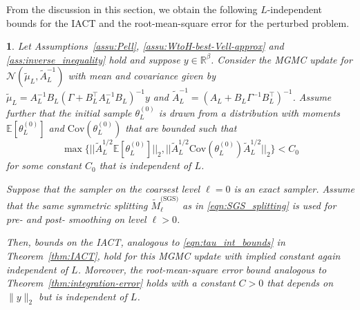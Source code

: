 \documentclass[11pt,english]{article}
\theoremstyle{plain}
\newtheorem{thm}{\protect\theoremname}[section]
\theoremstyle{plain}
\theoremstyle{plain}
\theoremstyle{plain}
\numberwithin{equation}{section}
\providecommand{\theoremname}{Theorem}
\begin{document}
From the discussion in this section, we obtain the following $L$-independent bounds for the IACT and the root-mean-square error for the perturbed problem.
\begin{thm}\label{thm:IACT_posterior_robustness}
  Let Assumptions~\ref{assu:Pell}, \ref{assu:WtoH-best-Vell-approx} and \ref{ass:inverse_inequality} hold and suppose %
  $y\in\mathbb{R}^{\beta}$. Consider the MGMC update
  for $\mathcal{N}(\widetilde{\mu}_{L},\widetilde{A}_{L}^{-1})$
	with mean and covariance given by $\widetilde{\mu}_{L}=A_{L}^{-1}B_{L}(\Gamma+B_{L}^{\top}A_{L}^{-1}B_{L})^{-1}y$
	and $\widetilde{A}_{L}^{-1}=(A_{L}+B_{L}\Gamma^{-1}B_{L}^{\top})^{-1}$.
        Assume further that the initial sample $\theta_{L}^{(0)}$ is drawn from
	a distribution with moments $\mathbb{E}[\theta_{L}^{(0)}]$ and $\mathrm{Cov}(\theta_{L}^{(0)})$
	that are bounded such that
        \[  \max\{||\widetilde{A}_{L}^{1/2}\mathbb{E}[\theta_{L}^{(0)}]||_{2},||\widetilde{A}_{L}^{1/2}\mathrm{Cov}(\theta_{L}^{(0)})\widetilde{A}_{L}^{1/2}||_{2}\}<C_{0}
          \]
          for some constant $C_{0}$ that is independent of $L$.
          
	Suppose that the sampler on the coarsest level $\ell=0$ is an exact
	sampler. Assume that the same symmetric splitting $\widetilde{M}_{\ell}^{\text{(SGS)}}$
	as in \eqref{eqn:SGS_splitting} is used for pre- and post- smoothing
	on level $\ell>0$. 

	Then, bounds on the IACT, analogous to \eqref{eqn:tau_int_bounds} in Theorem~\ref{thm:IACT}, hold for this MGMC update with implied constant again independent of $L$. Moreover,
	the root-mean-square error bound analogous to Theorem~\ref{thm:integration-error}
	holds with a constant $C>0$ that depends on $\|y\|_{2}$
	but is independent of $L$.
\end{thm}
\end{document}
